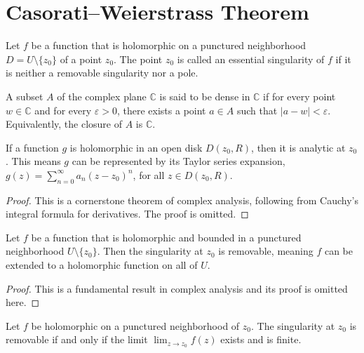 \chapter{Casorati–Weierstrass Theorem}

\begin{definition}
    \label{def:Essential_Singularity}
    Let $f$ be a function that is holomorphic on a punctured neighborhood $D = U \setminus \{z_0\}$ of a point $z_0$. The point $z_0$ is called an essential singularity of $f$ if it is neither a removable singularity nor a pole.
\end{definition}

\begin{definition}
    \label{def:Dense_Set}
    A subset $A$ of the complex plane $\mathbb{C}$ is said to be dense in $\mathbb{C}$ if for every point $w \in \mathbb{C}$ and for every $\varepsilon > 0$, there exists a point $a \in A$ such that $|a - w| < \varepsilon$. Equivalently, the closure of $A$ is $\mathbb{C}$.
\end{definition}

\begin{lemma}
    \label{lem:Holomorphic_Implies_Analytic}
    If a function $g$ is holomorphic in an open disk $D(z_0, R)$, then it is analytic at $z_0$. This means $g$ can be represented by its Taylor series expansion, $g(z) = \sum_{n=0}^{\infty} a_n (z-z_0)^n$, for all $z \in D(z_0, R)$.
\end{lemma}

\begin{proof}
    This is a cornerstone theorem of complex analysis, following from Cauchy's integral formula for derivatives. The proof is omitted.
\end{proof}

\begin{lemma}
    \label{lem:Riemann_Removable_Singularity}
    Let $f$ be a function that is holomorphic and bounded in a punctured neighborhood $U \setminus \{z_0\}$. Then the singularity at $z_0$ is removable, meaning $f$ can be extended to a holomorphic function on all of $U$.
\end{lemma}

\begin{proof}
    This is a fundamental result in complex analysis and its proof is omitted here.
\end{proof}

\begin{lemma}
    \label{lem:Characterization_of_Removable_Singularities}
    Let $f$ be holomorphic on a punctured neighborhood of $z_0$. The singularity at $z_0$ is removable if and only if the limit $\lim_{z \to z_0} f(z)$ exists and is finite.
\end{lemma}

